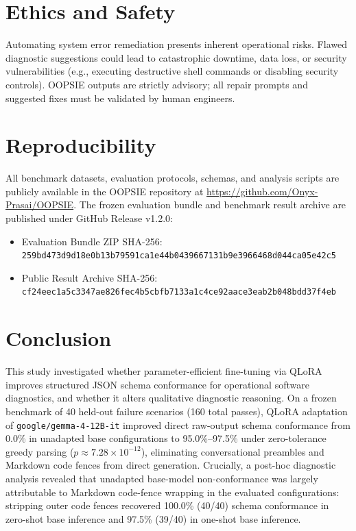 \documentclass[11pt,a4paper]{article}
\begin{document}
\section{Ethics and Safety}

Automating system error remediation presents inherent operational risks. Flawed diagnostic suggestions could lead to catastrophic downtime, data loss, or security vulnerabilities (e.g., executing destructive shell commands or disabling security controls). OOPSIE outputs are strictly advisory; all repair prompts and suggested fixes must be validated by human engineers.

\section{Reproducibility}

All benchmark datasets, evaluation protocols, schemas, and analysis scripts are publicly available in the OOPSIE repository at \url{https://github.com/Onyx-Prasai/OOPSIE}. The frozen evaluation bundle and benchmark result archive are published under GitHub Release v1.2.0:
\begin{itemize}
    \item Evaluation Bundle ZIP SHA-256:\\
    \texttt{259bd473d9d18e0b13b79591ca1e44b0439667131b9e3966468d044ca05e42c5}
    \item Public Result Archive SHA-256:\\
    \texttt{cf24eec1a5c3347ae826fec4b5cbfb7133a1c4ce92aace3eab2b048bdd37f4eb}
\end{itemize}

\section{Conclusion}

This study investigated whether parameter-efficient fine-tuning via QLoRA improves structured JSON schema conformance for operational software diagnostics, and whether it alters qualitative diagnostic reasoning. On a frozen benchmark of 40 held-out failure scenarios (160 total passes), QLoRA adaptation of \texttt{google/gemma-4-12B-it} improved direct raw-output schema conformance from 0.0\% in unadapted base configurations to 95.0\%--97.5\% under zero-tolerance greedy parsing ($p \approx 7.28 \times 10^{-12}$), eliminating conversational preambles and Markdown code fences from direct generation. Crucially, a post-hoc diagnostic analysis revealed that unadapted base-model non-conformance was largely attributable to Markdown code-fence wrapping in the evaluated configurations: stripping outer code fences recovered 100.0\% (40/40) schema conformance in zero-shot base inference and 97.5\% (39/40) in one-shot base inference.
\end{document}
